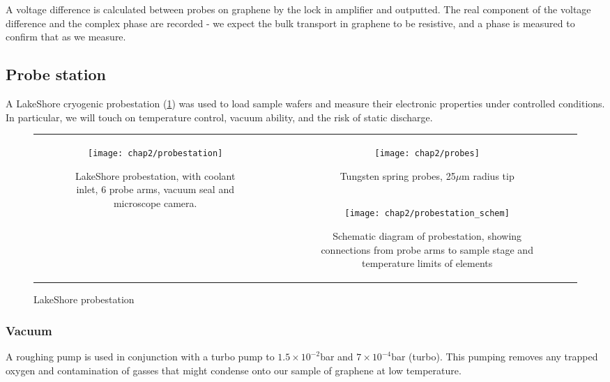 \documentclass[../../Matt_Gebert_Honours_Thesis.tex]{subfiles}
\begin{document}
	A voltage difference is calculated between probes on graphene by the lock in amplifier and outputted. The real component of the voltage difference and the complex phase are recorded - we expect the bulk transport in graphene to be resistive, and a phase is measured to confirm that as we measure.
	
	\subsection{Probe station}\label{sec:probestation}
	A LakeShore cryogenic probestation (\cref{fig:probestation}) was used to load sample wafers and measure their electronic properties under controlled conditions. In particular, we will touch on temperature control, vacuum ability, and the risk of static discharge.
		
	\begin{figure}[H]
		\centering
		\begin{tabular}[b]{cc}
			\multirow{2}{*}[1.5cm]{
				\centering
				\begin{subfigure}{0.55\textwidth}
					\centering
					\texttt{[image: chap2/probestation]}
					\caption{LakeShore probestation, with coolant inlet, 6 probe arms, vacuum seal and microscope camera.}
				\end{subfigure}
			}
			&\begin{subfigure}{0.4\textwidth}
				\centering
				\texttt{[image: chap2/probes]}
				\caption{Tungsten spring probes, 25$\mu$m radius tip}
			\end{subfigure}\vspace{0.5cm}\\
			&\begin{subfigure}[b]{0.4\textwidth}
				\texttt{[image: chap2/probestation\_schem]}
				\caption[Schematic diagram of probestation]{Schematic diagram of probestation, showing connections from probe arms to sample stage and temperature limits of elements}
			\end{subfigure}\\
		\end{tabular}
		\caption[LakeShore Probestation]{LakeShore probestation}\label{fig:probestation}
	\end{figure}
	
	\subsubsection{Vacuum}
	A roughing pump is used in conjunction with a turbo pump to $1.5\times10^{-2}$bar and $7\times10^{-4}$bar (turbo). This pumping removes any trapped oxygen and contamination of gasses that might condense onto our sample of graphene at low temperature. 
	
\end{document}
